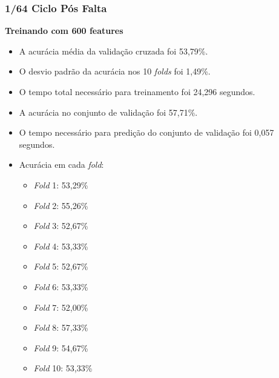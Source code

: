\subsubsection{1/64 Ciclo Pós Falta}
\textbf{Treinando com 600 features}
\begin{itemize}
    \item A acurácia média da validação cruzada foi 53,79\%.
    \item O desvio padrão da acurácia nos 10 \textit{folds} foi 1,49\%.
    \item O tempo total necessário para treinamento foi 24,296 segundos.
    \item A acurácia no conjunto de validação foi 57,71\%.
    \item O tempo necessário para predição do conjunto de validação foi 0,057 segundos.
    \item Acurácia em cada \textit{fold}:
    \begin{itemize}
        \item \textit{Fold} 1: 53,29\%
        \item \textit{Fold} 2: 55,26\%
        \item \textit{Fold} 3: 52,67\%
        \item \textit{Fold} 4: 53,33\%
        \item \textit{Fold} 5: 52,67\%
        \item \textit{Fold} 6: 53,33\%
        \item \textit{Fold} 7: 52,00\%
        \item \textit{Fold} 8: 57,33\%
        \item \textit{Fold} 9: 54,67\%
        \item \textit{Fold} 10: 53,33\%
    \end{itemize}
\end{itemize}

